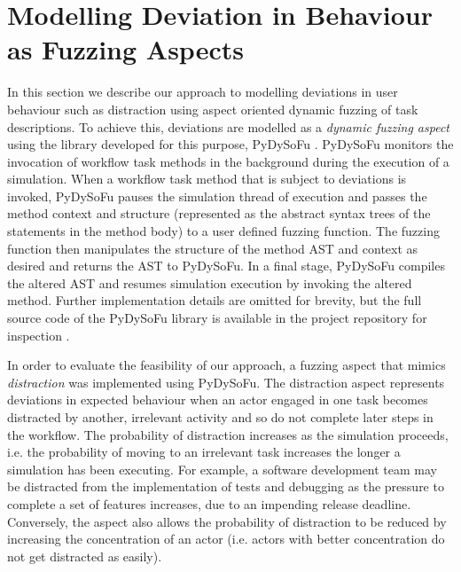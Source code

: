 \documentclass{llncs}
\begin{document}

\section{Modelling Deviation in Behaviour as Fuzzing Aspects}
\label{sec:fuzzing}


In this section we describe our approach to modelling deviations in user behaviour such as distraction using aspect
oriented dynamic fuzzing of task descriptions.  To achieve this, deviations are modelled as a \emph{dynamic fuzzing
  aspect} using the library developed for this purpose, PyDySoFu \cite{storer2016pydysofu-scm}.  PyDySoFu monitors the
invocation of workflow task methods in the background during the execution of a simulation.  When a workflow task method
that is subject to deviations is invoked, PyDySoFu pauses the simulation thread of execution and passes the method
context and structure (represented as the abstract syntax trees of the statements in the method body) to a user defined
fuzzing function.  The fuzzing function then manipulates the structure of the method AST and context as desired and
returns the AST to PyDySoFu.  In a final stage, PyDySoFu compiles the altered AST and resumes simulation execution by
invoking the altered method.  Further implementation details are omitted for brevity, but the full source code of the
PyDySoFu library is available in the project repository for inspection \cite{storer2016pydysofu-scm}.

In order to evaluate the feasibility of our approach, a fuzzing aspect that mimics \emph{distraction} was implemented
using PyDySoFu.  The distraction aspect represents deviations in expected behaviour when an actor engaged in one task
becomes distracted by another, irrelevant activity and so do not complete later steps in the workflow.  The probability
of distraction increases as the simulation proceeds, i.e. the probability of moving to an irrelevant task increases the
longer a simulation has been executing.  For example, a software development team may be distracted from the
implementation of tests and debugging as the pressure to complete a set of features increases, due to an impending
release deadline.  Conversely, the aspect also allows the probability of distraction to be reduced by increasing the
concentration of an actor (i.e. actors with better concentration do not get distracted as easily).
\end{document}

